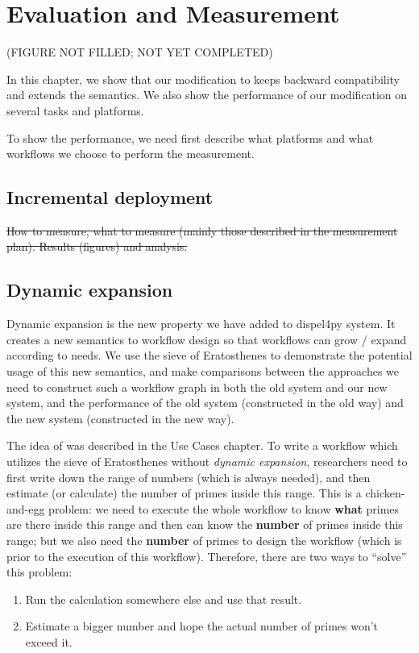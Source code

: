 \chapter{Evaluation and Measurement}
(FIGURE NOT FILLED; NOT YET COMPLETED)

In this chapter, we show that our modification to \dpy keeps backward compatibility and extends the semantics. We also show the performance of our modification on several tasks and platforms.

To show the performance, we need first describe what platforms and what workflows we choose to perform the measurement.

\section{Incremental deployment}
\sout{How to measure, what to measure  (mainly those described in the measurement plan).
Results (figures) and analysis.}

\section{Dynamic expansion}
Dynamic expansion is the new property we have added to dispel4py system. It creates a new semantics to workflow design so that workflows can grow / expand according to needs. We use the sieve of Eratosthenes to demonstrate the potential usage of this new semantics, and make comparisons between the approaches we need to construct such a workflow graph in both the old system and our new system, and the performance of the old system (constructed in the old way) and the new system (constructed in the new way).

The idea of \tsieve was described in the Use Cases chapter. To write a workflow which utilizes the sieve of Eratosthenes without \emph{dynamic expansion},  researchers need to first write down the range of numbers (which is always needed), and then estimate (or calculate) the number of primes inside this range. This is a chicken-and-egg problem: we need to execute the whole workflow to know \textbf{what} primes are there inside this range and then can know the \textbf{number} of primes inside this range; but we also need the \textbf{number} of primes to design the workflow (which is prior to the execution of this workflow). Therefore, there are two ways to ``solve'' this problem:
\begin{enumerate}
	\item Run the calculation somewhere else and use that result.
	\item Estimate a bigger number and hope the actual number of primes won't exceed it.
\end{enumerate}

